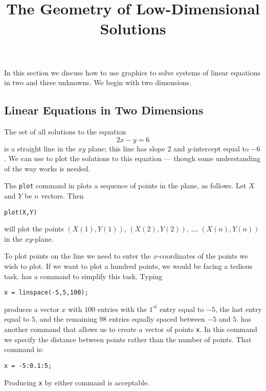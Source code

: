 \documentclass{ximera}
\title{The Geometry of Low-Dimensional Solutions}
\begin{document}
\begin{abstract}
\end{abstract}
\maketitle


\label{S:2.2}

In this section we discuss how to use \Matlab graphics to solve
systems of linear equations in two and three unknowns.  We begin
with two dimensions.

\subsection*{Linear Equations in Two Dimensions}

The set of all solutions to the equation
\begin{equation} \label{2x-y=6}
2x - y = 6
\end{equation}
is a straight line in the $xy$ plane; this line
has slope $2$ and $y$-intercept equal to $-6$.  We can use
\Matlab to plot the solutions to this equation --- though some
understanding of the way \Matlab works is needed.

The {\tt plot} command in \Matlab plots a sequence of points in
the plane, as follows.  Let $X$ and $Y$ be $n$ vectors. Then
\begin{verbatim}
plot(X,Y)
\end{verbatim} 
will plot the points $(X(1),Y(1))$, $(X(2),Y(2))$, \ldots,
$(X(n),Y(n))$ in the $xy$-plane.  

To plot points on the line
 we need to enter the $x$-coordinates of the points
we wish to plot.  If we want to plot a hundred points, we would
be facing a tedious task.  \Matlab has a command to simplify
this task. Typing
\begin{verbatim}
x = linspace(-5,5,100);
\end{verbatim} 
produces a vector $x$ with $100$ entries with the $1^{st}$ entry
equal to $-5$, the last entry equal to $5$, and the remaining $98$ 
entries equally spaced between $-5$ and $5$.  \Matlab has another command 
that allows us to create a vector of points {\tt x}.  In this command
we specify the distance between points rather than the number of 
points.  That command is:
\begin{verbatim}
x = -5:0.1:5;
\end{verbatim}
Producing {\tt x} by either command is acceptable.
\end{document}
